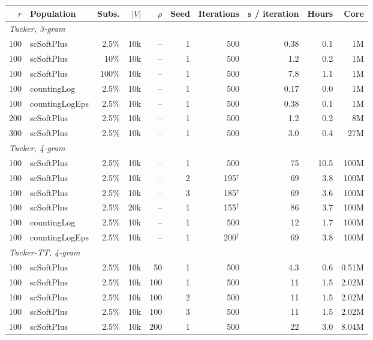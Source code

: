 \begin{table}[t]
  \centering
  \small
  \begin{tabular}{rlrrrrrrrr}
    \toprule
    $r$ & Population & Subs. & $|V|$ & $\rho$ & Seed & Iterations & s / iteration & Hours & Core \\
    \midrule
    \multicolumn{10}{l}{\textit{Tucker, 3-gram}} \\
    100 & scSoftPlus & 2.5\% & 10k & -- & 1 & 500 & 0.38 & 0.1 & 1M \\
    100 & scSoftPlus & 10\% & 10k & -- & 1 & 500 & 1.2 & 0.2 & 1M \\
    100 & scSoftPlus & 100\% & 10k & -- & 1 & 500 & 7.8 & 1.1 & 1M \\
    100 & countingLog & 2.5\% & 10k & -- & 1 & 500 & 0.17 & 0.0 & 1M \\
    100 & countingLogEps & 2.5\% & 10k & -- & 1 & 500 & 0.38 & 0.1 & 1M \\
    200 & scSoftPlus & 2.5\% & 10k & -- & 1 & 500 & 1.2 & 0.2 & 8M \\
    300 & scSoftPlus & 2.5\% & 10k & -- & 1 & 500 & 3.0 & 0.4 & 27M \\
    \midrule
    \multicolumn{10}{l}{\textit{Tucker, 4-gram}} \\
    100 & scSoftPlus & 2.5\% & 10k & -- & 1 & 500 & 75 & 10.5 & 100M \\
    100 & scSoftPlus & 2.5\% & 10k & -- & 2 & 195$^\dagger$ & 69 & 3.8 & 100M \\
    100 & scSoftPlus & 2.5\% & 10k & -- & 3 & 185$^\dagger$ & 69 & 3.6 & 100M \\
    100 & scSoftPlus & 2.5\% & 20k & -- & 1 & 155$^\dagger$ & 86 & 3.7 & 100M \\
    100 & countingLog & 2.5\% & 10k & -- & 1 & 500 & 12 & 1.7 & 100M \\
    100 & countingLogEps & 2.5\% & 10k & -- & 1 & 200$^\dagger$ & 69 & 3.8 & 100M \\
    \midrule
    \multicolumn{10}{l}{\textit{Tucker-TT, 4-gram}} \\
    100 & scSoftPlus & 2.5\% & 10k & 50 & 1 & 500 & 4.3 & 0.6 & 0.51M \\
    100 & scSoftPlus & 2.5\% & 10k & 100 & 1 & 500 & 11 & 1.5 & 2.02M \\
    100 & scSoftPlus & 2.5\% & 10k & 100 & 2 & 500 & 11 & 1.5 & 2.02M \\
    100 & scSoftPlus & 2.5\% & 10k & 100 & 3 & 500 & 11 & 1.5 & 2.02M \\
    100 & scSoftPlus & 2.5\% & 10k & 200 & 1 & 500 & 22 & 3.0 & 8.04M \\

\end{tabular}
\end{table}
